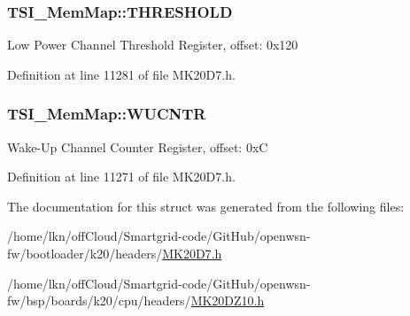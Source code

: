 \subsubsection[{\texorpdfstring{T\+H\+R\+E\+S\+H\+O\+LD}{THRESHOLD}}]{ T\+S\+I\+\_\+\+Mem\+Map\+::\+T\+H\+R\+E\+S\+H\+O\+LD}\hypertarget{struct_t_s_i___mem_map_a716863c50b790ef08399633c624ad313}{}\label{struct_t_s_i___mem_map_a716863c50b790ef08399633c624ad313}
Low Power Channel Threshold Register, offset\+: 0x120 

Definition at line 11281 of file M\+K20\+D7.\+h.

\subsubsection[{\texorpdfstring{W\+U\+C\+N\+TR}{WUCNTR}}]{ T\+S\+I\+\_\+\+Mem\+Map\+::\+W\+U\+C\+N\+TR}\hypertarget{struct_t_s_i___mem_map_ae36ce42bd55889c91be08af94a07203e}{}\label{struct_t_s_i___mem_map_ae36ce42bd55889c91be08af94a07203e}
Wake-\/\+Up Channel Counter Register, offset\+: 0xC 

Definition at line 11271 of file M\+K20\+D7.\+h.



The documentation for this struct was generated from the following files\+:\begin{DoxyCompactItemize}
\item 
/home/lkn/off\+Cloud/\+Smartgrid-\/code/\+Git\+Hub/openwsn-\/fw/bootloader/k20/headers/\hyperlink{bootloader_2k20_2headers_2_m_k20_d7_8h}{M\+K20\+D7.\+h}\item 
/home/lkn/off\+Cloud/\+Smartgrid-\/code/\+Git\+Hub/openwsn-\/fw/bsp/boards/k20/cpu/headers/\hyperlink{_m_k20_d_z10_8h}{M\+K20\+D\+Z10.\+h}\end{DoxyCompactItemize}
